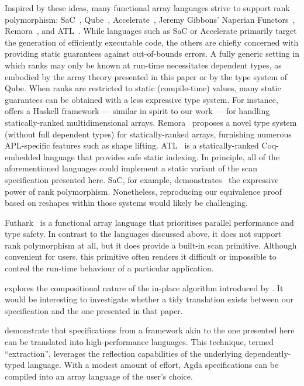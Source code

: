 Inspired by these ideas, many functional array languages strive to support rank
polymorphism: SaC~\citep{sac}, Qube~\citep{Qube}, Accelerate~\citep{MCGN15},
Jeremy Gibbons' Naperian Functors~\citep{Gibbons:APLicative},
Remora~\citep{Remora}, and ATL~\citep{ATL}.  While languages such as SaC or
Accelerate primarily target the generation of efficiently executable code, the
others are chiefly concerned with providing static guarantees against
out-of-bounds errors.  A fully generic setting in which ranks may only be known
at run-time necessitates dependent types, as embodied by the array theory
presented in this paper or by the type system of Qube.  When ranks are
restricted to static (compile-time) values, many static guarantees can be
obtained with a less expressive type system.  For instance,
\citet{Gibbons:APLicative} offers a Haskell framework --- similar in spirit to
our work --- for handling statically-ranked multidimensional arrays.
Remora~\citep{Remora} proposes a novel type system (without full dependent
types) for statically-ranked arrays, furnishing numerous APL-specific features
such as shape lifting.  ATL~\citep{ATL} is a statically-ranked Coq-embedded
language that provides safe static indexing.  In principle, all of the
aforementioned languages could implement a static variant of the scan
specification presented here.  SaC, for example,
demonstrates~\citep{10.1145/3520306.3534500} the expressive power of rank
polymorphism.  Nonetheless, reproducing our equivalence proof based on reshapes
within those systems would likely be challenging.

Futhark~\citep{henriksen:phdthesis} is a functional array language that
prioritises parallel performance and type safety.  In contrast to the languages
discussed above, it does not support rank polymorphism at all, but it does
provide a built-in scan primitive.  Although convenient for users, this
primitive often renders it difficult or impossible to control the run-time
behaviour of a particular application.


\citet{Hinze:ScanAlgebra} explores the compositional nature of
the in-place algorithm introduced by \citet{GEBlelloch:prefixsums}.  It would be interesting to
investigate whether a tidy translation exists between our specification and the
one presented in that paper.

\citet{abs-2105-10819} demonstrate that specifications from a framework akin
to the one presented here can be translated into high-performance languages.
This technique, termed ``extraction'', leverages the reflection capabilities of
the underlying dependently-typed language.  With a modest amount of effort,
Agda specifications can be compiled into an array language of the user's
choice.

